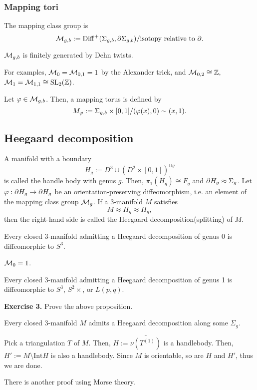 \documentclass{../../small}
\begin{document}
\subsubsection*{Mapping tori}
The mapping class group is
\[\cM_{g,b}:=\mathrm{Diff}^+(\Sigma_{g,b},\pd\Sigma_{g,b})/\text{isotopy relative to }\pd.\]

\begin{thm}
$\mathcal{M}_{g,b}$ is finitely generated by Dehn twists.
\end{thm}
For examples, $\mathcal{M}_0=\mathcal{M}_{0,1}=1$ by the Alexander trick, and $\mathcal{M}_{0,2}\cong\mathbb{Z}$, $\mathcal{M}_1=\mathcal{M}_{1,1}\cong\mathrm{SL}_2(\mathbb{Z})$.

Let $\varphi\in\mathcal{M}_{g,b}$.
Then, a mapping torus is defined by
\[M_\varphi:=\Sigma_{g,b}\times[0,1]/(\varphi(x),0)\sim(x,1).\]

\subsection{Heegaard decomposition}

A manifold with a boundary
\[H_g:=D^3\cup(D^2\times[0,1])^{\sqcup g}\]
is called the handle body with genus $g$.
Then, $\pi_1(H_g)\cong F_g$ and $\pd H_g\approx\Sigma_g$.
Let $\f:\pd H_g\to\pd H_g$ be an orientation-preserving diffeomorphism, i.e. an element of the mapping class group $\mathcal{M}_g$.
If a 3-manifold $M$ satisfies
\[M\approx H_g\approx H_g,\]
then the right-hand side is called the Heegaard decomposition(splitting) of $M$.
\begin{prop}
Every closed 3-manifold admitting a Heegaard decomposition of genus 0 is diffeomorphic to $S^3$.
\end{prop}
\begin{pf}
$\mathcal{M}_0=1$.
\end{pf}
\begin{prop}
Every closed 3-manifold admitting a Heegaard decomposition of genus 1 is diffeomorphic to $S^3$, $S^2\times$, or $L(p,q)$.
\end{prop}
\textbf{Exercise 3.} Prove the above proposition.
\begin{thm}
Every closed 3-manifold $M$ admits a Heegaard decomposition along some $\Sigma_g$.
\end{thm}
\begin{pf}
Pick a triangulation $T$ of $M$.
Then, $H:=\bar{\nu(T^{(1)})}$ is a handlebody.
Then, $H':=M\setminus\mathrm{Int}H$ is also a handlebody.
Since $M$ is orientable, so are $H$ and $H'$, thus we are done.
\end{pf}
There is another proof using Morse theory.
\end{document}
